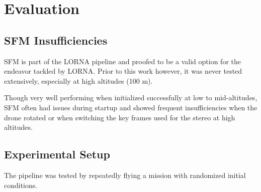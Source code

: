 \chapter{Evaluation}
\label{chapter:evaluation}

\section{SFM Insufficiencies}\label{subsec:sfm_insufficiencies}
SFM is part of the LORNA pipeline and proofed to be a valid option for the endeavor tackled by LORNA. Prior to this work however, it was never tested extensively, especially at high altitudes (100 m).

Though very well performing when initialized successfully at low to mid-altitudes, SFM often had issues during startup and showed frequent insufficiencies when the drone rotated or when switching the key frames used for the stereo at high altitudes.




\section{Experimental Setup}\label{sec:exp_setup}

The pipeline was tested by repeatedly flying a mission with randomized initial conditions.

